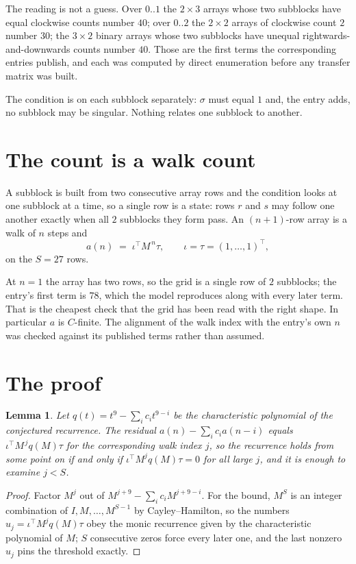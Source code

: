 \documentclass[11pt,a4paper]{article}
\theoremstyle{plain}
\newtheorem{lemma}[theorem]{Lemma}
\theoremstyle{definition}
\begin{document}
The reading is not a guess. Over $0..1$ the $2\times3$ arrays whose two subblocks have equal
clockwise counts number $40$; over $0..2$ the $2\times2$ arrays of clockwise count $2$ number
$30$; the $3\times2$ binary arrays whose two subblocks have unequal rightwards-and-downwards
counts number $40$. Those are the first terms the corresponding entries publish, and each was
computed by direct enumeration before any transfer matrix was built.

The condition is on each subblock separately: $\sigma$ must equal $1$ and, the entry adds, no subblock may be singular. Nothing
relates one subblock to another.

\section{The count is a walk count}

A subblock is built from two consecutive array rows and the condition looks
at one subblock at a time, so a single row is a state: rows $r$ and $s$ may follow one another
exactly when all $2$ subblocks they form pass. An $(n+1)$-row array is a walk of $n$ steps and
\[
a(n)\;=\;\iota^{\!\top}M^{\,n}\tau,\qquad\iota=\tau=(1,\dots,1)^{\!\top},
\]
on the $S=27$ rows.

At $n=1$ the array has two rows, so the grid is a single row of $2$
subblocks; the entry's first term is $78$, which the model
reproduces along with every later term. That is the cheapest check that the grid has been read
with the right shape.
In particular $a$ is $C$-finite. The alignment of the walk index with the entry's own $n$ was
checked against its published terms rather than assumed.

\section{The proof}

\begin{lemma}\label{lem:crit}
Let $q(t)=t^{9}-\sum_i c_it^{9-i}$ be the characteristic polynomial of the
conjectured recurrence. The residual $a(n)-\sum_ic_ia(n-i)$ equals
$\iota^{\!\top}M^{\,j}q(M)\tau$ for the corresponding walk index $j$, so the recurrence
holds from some point on if and only if $\iota^{\!\top}M^{j}q(M)\tau=0$ for all large $j$,
and it is enough to examine $j<S$.
\end{lemma}

\begin{proof}
Factor $M^{j}$ out of $M^{j+9}-\sum_ic_iM^{j+9-i}$. For the bound, $M^{S}$
is an integer combination of $I,M,\dots,M^{S-1}$ by Cayley--Hamilton, so the numbers
$u_j=\iota^{\!\top}M^{j}q(M)\tau$ obey the monic recurrence given by the characteristic
polynomial of $M$; $S$ consecutive zeros force every later one, and the last nonzero $u_j$
pins the threshold exactly.
\end{proof}
\end{document}
